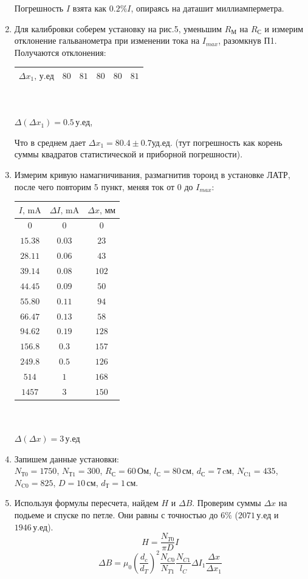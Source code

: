 \documentclass[a4paper]{article}
\begin{document}
\begin{enumerate}
Погрешность $I$ взята как $0.2\%I$, опираясь на даташит миллиамперметра.


\item
Для калибровки соберем установку на рис.5, уменьшим $R_\text{М}$ на $R_\text{С}$ и измерим отклонение гальванометра при изменении тока на $I_{max}$, разомкнув П1.
Получаются отклонения:
\begin{center}
\begin{tabular}{|c|c|c|c|c|c|}\hline
$\Delta x_1,\,\text{у.ед}$&$80$&$81$&$80$&$80$&$81$\\\hline
\end{tabular}\\~\\
$\Delta (\Delta x_1) = 0.5\,\text{у.ед}$,
\end{center}
Что в среднем дает $\Delta x_1=80.4\pm0.7\text{уд.ед.}$ (тут погрешность как корень суммы квадратов статистической и приборной погрешности).

\newpage
\item
Измерим кривую намагничивания, размагнитив тороид в установке ЛАТР, после чего повторим 5 пункт, меняя ток от $0$ до $I_{max}$:

\begin{center}
\begin{tabular}{|c|c|c|}\hline
$I\text{, mA}$&$\Delta I\text{, mA}$&$\Delta x\text{, мм}$\\\hline
$0$&$0$&$0$\\\hline
$15.38$&$0.03$&$23$\\\hline
$28.11$&$0.06$&$43$\\\hline
$39.14$&$0.08$&$102$\\\hline
$44.45$&$0.09$&$50$\\\hline
$55.80$&$0.11$&$94$\\\hline
$66.47$&$0.13$&$58$\\\hline
$94.62$&$0.19$&$128$\\\hline
$156.8$&$0.3$&$157$\\\hline
$249.8$&$0.5$&$126$\\\hline
$514$&$1$&$168$\\\hline
$1457$&$3$&$150$\\\hline
\end{tabular}\\~\\
$\Delta (\Delta x)=3\,\text{у.ед}$
\end{center}

\item
Запишем данные установки:\\
$N_\text{Т0}=1750$, $N_\text{Т1}=300$, $R_\text{С}=60\,\text{Ом}$, $l_\text{С}=80\,\text{см}$, $d_\text{С}=7\,\text{cм}$, $N_\text{C1}=435$, $N_\text{C0}=825$, $D=10\,\text{см}$, $d_\text{Т}=1\,\text{см}$.
\item
Используя формулы пересчета, найдем $H$ и $\Delta B$.
Проверим суммы $\Delta x$ на подьеме и спуске по петле. Они равны с точностью до $6\%$ ($2071\,\text{у.ед}$ и $1946\,\text{у.ед}$).
$$H=\frac{N_{T0}}{\pi D}I$$
$$\Delta B = \mu_0 \left(\frac{d_c}{d_T}\right)^2\frac{N_{C0}}{N_{T1}}\frac{N_{C1}}{l_C}\Delta I_1 \frac{\Delta x}{\Delta x_1}$$


\end{enumerate}
\end{document}
